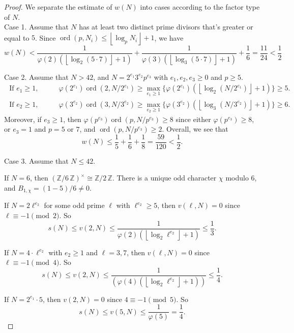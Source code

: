\documentclass{amsart}[11pt]
\theoremstyle{definition}
\numberwithin{equation}{section}
\theoremstyle{notitle}
\begin{document}
\begin{proof}
We separate the estimate of $w(N)$ into cases according to the factor
type of $N$.  \\

Case 1. Assume that $N$ has at least two distinct prime
divisors that's greater or equal to $5$. Since $\operatorname{ord}(p, N_i)\leq
{\left\lfloor {\log_p N_i} \right\rfloor}+1$, we have
\[  w(N)< \frac{1}{\varphi(2)({\left\lfloor {\log_2 (5\cdot
    7)} \right\rfloor}+1)}+\frac{1}{\varphi(3)({\left\lfloor {\log_3(5\cdot 7)} \right\rfloor}+1)}+ \frac{1}{6}=\frac{11}{24}<\frac{1}{2}\]

Case 2. Assume that $N>42$, and $N=2^{e_1}3^{e_2}p^{e_3}$ with $e_1, e_2, e_3\geq 0$ and
$p\geq 5$. 
\begin{align*}
\text{ If } e_1\geq 1,&\qquad   \varphi(2^{e_1})\operatorname{ord}(2, N/2^{e_1})\geq \max_{e_1\geq
    1}\big\{\varphi(2^{e_1})({\left\lfloor {\log_2(N/2^{e_1})} \right\rfloor}+1)\big\}\geq 5.\\
\text{ If } e_2\geq 1, &\qquad \varphi(3^{e_2})\operatorname{ord}(3, N/3^{e_2})\geq \max_{e_2\geq
  1}\big\{\varphi(3^{e_2})({\left\lfloor {\log_3(N/3^{e_2})} \right\rfloor}+1)\big\}\geq 6.
\end{align*}
Moreover, if $e_3\geq 1$, then 
$\varphi(p^{e_3})\operatorname{ord}(p, N/p^{e_3})\geq 8$ since either $\varphi(p^{e_3})\geq 8$,
or $e_3=1$ and $p=5$ or $7$, and $\operatorname{ord}(p, N/p^{e_3})\geq 2$. 
Overall, we see that 
\[ w(N)\leq \frac{1}{5}+\frac{1}{6}+\frac{1}{8}=\frac{59}{120}<\frac{1}{2}.\]
  
Case 3. Assume that $N\leq 42$. 

If $N=6$, then ${(\mathbb{Z}/ {6}\, \mathbb{Z})^\times}\cong {\mathbb{Z}/ {2}\, \mathbb{Z}}$. There is a unique odd
character $\chi$ modulo 6, and $B_{1,\chi}= (1-5)/6\neq 0$.

If $N=2\ell^{e_2}$ for some odd prime $\ell$ with $\ell^{e_2}\geq 5$,
then $v(\ell, N)=0$ since $\ell \equiv -1 \pmod{2}$. So
\[ s(N)\leq v(2, N)\leq  \frac{1}{\varphi(2)({\left\lfloor {\log_2 \ell^{e_2}} \right\rfloor}+1)}
\leq \frac{1}{3}.\]

If $N=4\cdot \ell^{e_2}$ with $e_2\geq 1$ and $\ell=3,7$, then $v(\ell,
N)=0$ since $\ell\equiv -1 \pmod{4}$. So
\[ s(N)\leq v(2, N)\leq
\frac{1}{(\varphi(4)({\left\lfloor {\log_2\ell^{e_2}} \right\rfloor}+1))}\leq \frac{1}{4}. \]

If $N=2^{e_1}\cdot 5$, then $v(2,N)=0$ since $4\equiv -1 \pmod{5}$. So 
\[ s(N)\leq v(5, N) \leq \frac{1}{\varphi(5)} =\frac{1}{4}.\]


\end{proof}
\end{document}
